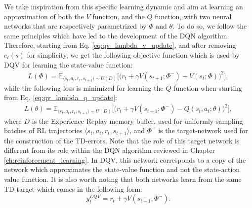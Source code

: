 We take inspiration from this specific learning dynamic and aim at learning an approximation of both the $V$ function, and the $Q$ function, with two neural networks that are respectively parametrized by $\Phi$ and $\theta$. To do so, we follow the same principles which have led to the development of the DQN algorithm. Therefore, starting from Eq. \ref{eq:qv_lambda_v_update}, and after removing $e_{t}(s)$ for simplicity, we get the following objective function which is used by DQV for learning the state-value function:
\begin{multline}
L(\Phi) = \mathds{E}_{\langle s_{t},a_{t},r_{t},s_{t+1}\rangle\sim U(D)} \bigg[\big(r_{t} + \gamma V(s_{t+1}; \Phi^{-}) - V(s_{t}; \Phi)\big)^{2}\bigg],
\label{eq:dqv_v_update}
\end{multline}
while the following loss is minimized for learning the $Q$ function when starting from Eq. \ref{eq:qv_lambda_q_update}:
\begin{multline}
    L(\theta) = \mathds{E}_{\langle s_{t},a_{t},r_{t},s_{t+1}\rangle\sim U(D)} \bigg[\big(r_{t} + \gamma V(s_{t+1}; \Phi^{-}) - Q(s_{t}, a_{t}; \theta)\big)^{2}\bigg],
\label{eq:dqv_q_update}
\end{multline}
where $D$ is the Experience-Replay memory buffer, used for uniformly sampling batches of RL trajectories $\langle s_{t},a_{t},r_{t},s_{t+1}\rangle$, and $\Phi^{-}$ is the target-network used for the construction of the TD-errors. Note that the role of this target network is different from its role within the DQN algorithm reviewed in Chapter \ref{ch:reinforcement_learning}. In DQV, this network corresponds to a copy of the network which approximates the state-value function and not the state-action value function. It is also worth noting that both networks learn from the same TD-target which comes in the following form:
\begin{equation}
y_{t}^{DQV} = r_{t} + \gamma V(s_{t+1}; \Phi^{-}). 
\end{equation}

